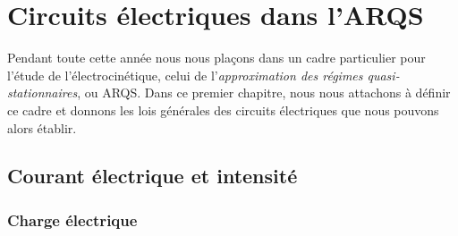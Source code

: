 \documentclass[../main/main.tex]{subfiles}
\begin{document}
\setcounter{chapter}{0}

\chapter{Circuits \'electriques dans l'ARQS}

Pendant toute cette année nous nous plaçons dans un cadre particulier pour
l'étude de l'électrocinétique, celui de l'\textit{approximation des régimes
quasi-stationnaires}, ou ARQS. Dans ce premier chapitre, nous nous attachons à
définir ce cadre et donnons les lois générales des circuits électriques que nous
pouvons alors établir.

\section{Courant électrique et intensité}
\subsection{Charge électrique}
\end{document}
